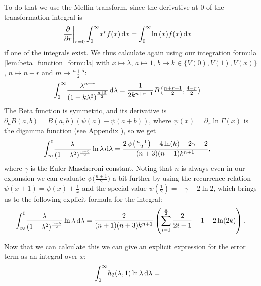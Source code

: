 To do that we use the Mellin transform, since the derivative at $0$ of the
transformation integral is
\begin{align*}
    \left.\frac\partial{\partial r}\right|_{r=0}\Integ[\infty]{0}{x}{x^r f(x)}
    &= \Integ[\infty]{0}{x}{\ln{(x)} f(x)}
\end{align*}
if one of the integrals exist. We thus calculate again using our integration
formula \ref{lem:beta_function_formula} with $x\mapsto \lambda$, $a \mapsto 1$,
$b \mapsto k \in\{V(0), V(1), V(x)\}$, $n \mapsto n + r$ and $m \mapsto
\tfrac{n+5}{2}$:
\begin{align*}
    \Integ[\infty]{0}{\lambda}{\frac{\lambda^{n + r}}{\left(1 +
    k\lambda^2\right)^{\frac{n+5}{2}}}} &=
      \frac{1}{2k^{n+r+1}} B\bigl(\tfrac{n+r+1}{2}, \tfrac{4-r}{2}\bigr)
\end{align*}
The Beta function is symmetric, and its derivative is $\partial_a B(a,b) =
B(a,b) (\psi(a) - \psi(a+b))$, where $\psi(x) = \partial_x \ln\Gamma(x)$ is the
digamma function (see Appendix %
), so we get
\begin{align*}
  \Integ[0]{\infty}{\lambda}{
    \frac{\lambda}{(1 + \lambda^2)^{\frac{n+5}{2}}}\ln\lambda
  } &=
      \frac{
        2\,\psi\bigl(\frac{n+1}{2}\bigr) - 4\ln(k) + 2\gamma - 2
      }{
           (n+3)(n+1)k^{n+1}
      },
\end{align*}
where $\gamma$ is the Euler-Mascheroni constant. Noting that $n$ is always even
in our expansion we can evaluate $\psi\bigl(\tfrac{n+1}{2}\bigr)$ a bit further
by using the recurrence relation
$\psi(x + 1) = \psi(x) + \tfrac{1}{x}$ and the special value $\psi(\tfrac{1}{2})
= -\gamma - 2\ln 2$, which brings us to the following explicit formula for the
integral:
\begin{align}
  \Integ[0]{\infty}{\lambda}{
    \frac{\lambda}{(1 +\lambda^2)^{\frac{n+5}{2}}}
    \ln\lambda
  } = \frac{2}{(n+1)(n+3)k^{n+1}}
  \left( \sum_{i=1}^{\frac n 2}\frac{2}{2i - 1} -1 - 2\ln(2k) \right).
\end{align}

Now that we can calculate this we can give an explicit expression for the error
term as an integral over $x$:
\begin{align}
  \Integ[\infty]{0}{\lambda}{
    h_2(\lambda, 1) \ln\lambda
  }
  &=
\end{align}
